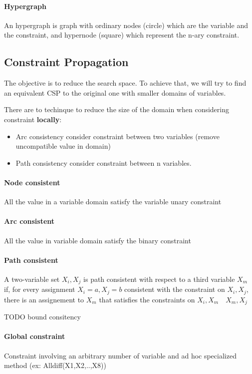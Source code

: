  \paragraph{Hypergraph}   An   hypergraph   is   graph   with   ordinary
 nodes (circle)  which   are  the   variable  and  the   constraint,  and
 hypernode (square) which represent the n-ary constraint.

\subsection{Constraint Propagation}

The objective  is to reduce the  search space. To achieve  that, we will
try to find  an equivalent CSP to the original  one with smaller domains
of variables.

There are to techinque to reduce the size of the domain when considering
constraint \textbf{locally}:
\begin{itemize}
    \item  Arc  consistency  consider  constraint  between  two  variables
      (remove uncompatible value in domain)
    \item Path consistency consider constraint between n variables.
\end{itemize}

\paragraph{Node consistent} All  the value in a  variable domain satisfy
the variable unary constraint

\paragraph{Arc consistent} All the value  in variable domain satisfy the
binary constraint

\paragraph{Path   consistent}   A   two-variable  set   ${X_i,X_j}$   is
path  consistent  with  respect  to  a  third  variable  $X_m$  if,  for
every  assignment  ${X_i=a,X_j=b}$  consistent with  the  constraint  on
${X_i,X_j}$,  there  is  an  assignement to  $X_m$  that  satisfies  the
constraints on ${X_i,X_m}\quad{X_m,X_j}$


TODO bound consitency

\paragraph{Global constraint}  Constraint involving an  arbitrary number
of variable and ad hoc specialized method (ex: Alldiff(X1,X2,..,X8))


